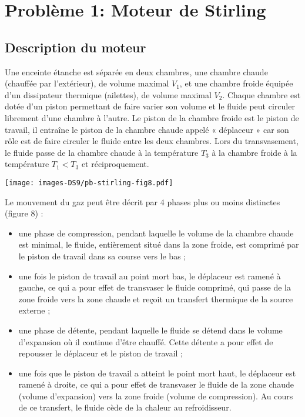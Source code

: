 \documentclass[
  10pt,
  french,
  a4paper,
  DIV=18]{scrartcl}
\providecommand{\tightlist}{%
  \setlength{\itemsep}{0pt}\setlength{\parskip}{0pt}}
\begin{document}
\section*{Problème 1: Moteur de
Stirling}\label{probluxe8me-1-moteur-de-stirling}

\subsection*{Description du moteur}\label{description-du-moteur}

Une enceinte étanche est séparée en deux chambres, une chambre chaude
(chauffée par l'extérieur), de volume maximal \(V_1\), et une chambre
froide équipée d'un dissipateur thermique (ailettes), de volume maximal
\(V_2\). Chaque chambre est dotée d'un piston permettant de faire varier
son volume et le fluide peut circuler librement d'une chambre à l'autre.
Le piston de la chambre froide est le piston de travail, il entraîne le
piston de la chambre chaude appelé « déplaceur » car son rôle est de
faire circuler le fluide entre les deux chambres. Lors du transvasement,
le fluide passe de la chambre chaude à la température \(T_3\) à la
chambre froide à la température \(T_1 < T_3\) et réciproquement.

\begin{center}

\texttt{[image: images-DS9/pb-stirling-fig8.pdf]}

\end{center}

Le mouvement du gaz peut être décrit par 4 phases plus ou moins
distinctes (figure 8) :

\begin{itemize}
\tightlist
\item
  une phase de compression, pendant laquelle le volume de la chambre
  chaude est minimal, le fluide, entièrement situé dans la zone froide,
  est comprimé par le piston de travail dans sa course vers le bas ;
\item
  une fois le piston de travail au point mort bas, le déplaceur est
  ramené à gauche, ce qui a pour effet de transvaser le fluide comprimé,
  qui passe de la zone froide vers la zone chaude et reçoit un transfert
  thermique de la source externe ;
\item
  une phase de détente, pendant laquelle le fluide se détend dans le
  volume d'expansion où il continue d'être chauffé. Cette détente a pour
  effet de repousser le déplaceur et le piston de travail ;
\item
  une fois que le piston de travail a atteint le point mort haut, le
  déplaceur est ramené à droite, ce qui a pour effet de transvaser le
  fluide de la zone chaude (volume d'expansion) vers la zone froide
  (volume de compression). Au cours de ce transfert, le fluide cède de
  la chaleur au refroidisseur.
\end{itemize}
\end{document}
